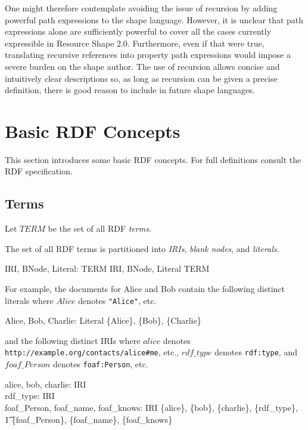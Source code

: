 \documentclass{article}
\begin{document}
One might therefore contemplate avoiding the issue of recursion by adding powerful path expressions to the shape language.
However, it is unclear that path expressions alone are sufficiently powerful to cover all the cases currently expressible in Resource Shape 2.0.
Furthermore, even if that were true, translating recursive references into property path expressions would impose a severe burden on the shape author.
The use of recursion allows concise and intuitively clear descriptions so, as long as recursion can be given a precise definition, 
there is good reason to include in future shape languages.

\cbend

\section{Basic RDF Concepts}
\label{sec-basics}

This section introduces some basic RDF concepts.
For full definitions consult the RDF specification\cite{w3c:rdf11}.

\subsection{Terms}

Let $TERM$ be the set of all RDF {\em terms}.
\begin{zed}
[TERM]
\end{zed}

The set of all RDF terms is partitioned into {\em IRIs}, {\em blank nodes}, and {\em literals}.
\begin{axdef}
IRI, BNode, Literal: \power TERM
\where
\langle IRI, BNode, Literal \rangle \partition TERM
\end{axdef}

For example, the documents for Alice and Bob contain the following distinct literals
where $Alice$ denotes {\tt "Alice"}, etc.
\begin{axdef}
	Alice, Bob, Charlie: Literal
\where
	\disjoint \langle \{Alice\}, \{Bob\}, \{Charlie\} \rangle
\end{axdef}
and the following distinct IRIs where $alice$ denotes {\tt http://example.org/contacts/alice\#me}, etc., 
$rdf\_type$ denotes {\tt rdf:type}, and
$foaf\_Person$ denotes {\tt foaf:Person}, etc.
\begin{axdef}
	alice, bob, charlie: IRI \\
	rdf\_type: IRI \\
	foaf\_Person, foaf\_name, foaf\_knows: IRI
\where
	\disjoint \langle \{alice\}, \{bob\}, \{charlie\}, \{rdf\_type\}, \\
\t1		\{foaf\_Person\}, \{foaf\_name\}, \{foaf\_knows\} \rangle
\end{axdef}
\end{document}
